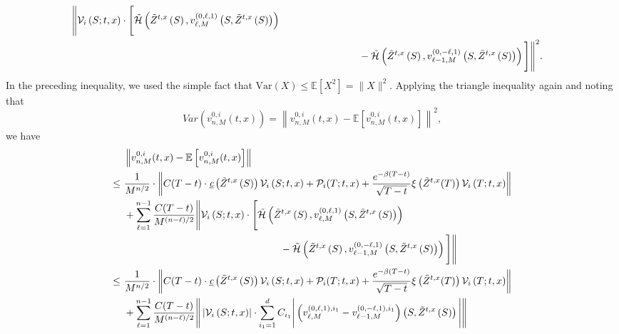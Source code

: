 \documentclass[11pt]{article}
\theoremstyle{definition}
\theoremstyle{plain}
\newcommand{\E}{\mathbb{E}}
\newcommand{\cH}{{\cal H}}
\begin{document}
\begin{appendices}
\begin{align*}
  \Bigg\|\mathcal{V}_i\left(S; t,x\right)\cdot 
  \Bigg[\tilde \cH\left(\tilde{Z}^{t,x}\left(S\right), v^{(0, \ell, 1)}_{\ell, M}\left(S, \tilde{Z}^{t,x}\left(S\right)\right) \right) \\
  & \qquad \qquad \qquad \qquad - \tilde \cH\left(\tilde{Z}^{t,x}\left(S\right), v^{(0, -\ell, 1)}_{\ell-1, M}\left(S, \tilde{Z}^{t,x}\left(S\right)\right) \right)\Bigg]\Bigg\|^2.
  \end{align*}
  In the preceding inequality, we used the simple fact that $\mathrm{Var}(X) \le \E[X^2]=\|X\|^2$. Applying the triangle inequality again and noting that
  \begin{equation}
  Var\left(v^{0,i}_{n,M}(t,x)\right) = \left\|v^{0,i}_{n,M}(t,x) - \E\left[v^{0,i}_{n,M}(t,x)\right]\right\|^2, 
  \end{equation}
  we have
  \begin{align}
  & ~ \left\|v^{0,i}_{n,M}(t,x) - \E\left[v^{0,i}_{n,M}(t,x)\right]\right\| \\
  \leq & ~ \frac{1}{M^{n/2}} \cdot\left\|C(T-t) \cdot \underbar{\em c}\left(\tilde{Z}^{t,x}\left(S\right)\right) \mathcal{V}_i\left(S; t,x\right)
  + \mathcal{P}_i(T; t,x) + \frac{e^{-\beta (T-t)}}{\sqrt{T-t}}\xi\left(\tilde{Z}^{t,x}(T)\right) \mathcal{V}_i\left(T; t,x\right)\right\|\\
  &~ + \sum_{\ell=1}^{n-1} \frac{C(T-t)}{M^{(n-\ell)/2}} 
  \Bigg\|\mathcal{V}_i\left(S; t,x\right)\cdot 
  \Bigg[\tilde \cH\left(\tilde{Z}^{t,x}\left(S\right), v^{(0, \ell, 1)}_{\ell, M}\left(S, \tilde{Z}^{t,x}\left(S\right)\right) \right) \\
  & \qquad \qquad \qquad \qquad \qquad \qquad \qquad \qquad 
  - \tilde \cH\left(\tilde{Z}^{t,x}\left(S\right), v^{(0, -\ell, 1)}_{\ell-1, M}\left(S, \tilde{Z}^{t,x}\left(S\right)\right) \right)\Bigg]\Bigg\| \\
  \leq & ~ \frac{1}{M^{n/2}} \cdot \left\|C(T-t) \cdot \underbar{\em c}\left(\tilde{Z}^{t,x}\left(S\right)\right) \mathcal{V}_i\left(S; t,x\right)
  + \mathcal{P}_i(T; t,x) + \frac{e^{-\beta (T-t)}}{\sqrt{T-t}}\xi\left(\tilde{Z}^{t,x}(T)\right) \mathcal{V}_i\left(T; t,x\right)\right\| \\
  &~ + \sum_{\ell=1}^{n-1} \frac{C(T-t)}{M^{(n-\ell)/2}} 
  \Bigg\| \left|\mathcal{V}_i\left(S; t,x\right) \right| \cdot 
  \sum_{i_1=1}^d C_{i_1}\Bigg| \left(v^{(0, \ell, 1), i_1}_{\ell, M} - v^{(0, -\ell, 1), i_1}_{\ell-1, M}\right)\left(S, \tilde{Z}^{t,x}\left(S\right)\right)\Bigg|\Bigg\| \\

\end{align}
\end{appendices}
\end{document}
